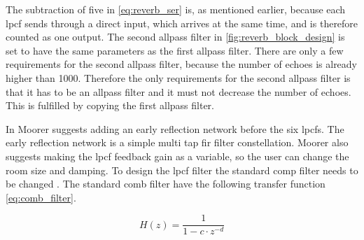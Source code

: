 The subtraction of five in \autoref{eq:reverb_ser} is, as mentioned earlier, because each \gls{lpcf} sends through a direct input, which arrives at the same time, and is therefore counted as one output.
The second allpass filter in \autoref{fig:reverb_block_design} is set to have the same parameters as the first allpass filter. There are only a few requirements for the second allpass filter, because the number of echoes is already higher than 1000. Therefore the only requirements for the second allpass filter is that it has to be an allpass filter and it must not decrease the number of echoes. This is fulfilled by copying the first allpass filter. 
    
%

%


In \citep{DAFX} Moorer suggests adding an early reflection network before the six \gls{lpcf}s. The early reflection network is a simple multi tap \gls{fir} filter constellation. Moorer also suggests making the \gls{lpcf} feedback gain as a variable, so the user can change the room size and damping. To design the \gls{lpcf} filter the standard comp filter needs to be changed  \citep{LPCFfd}. The standard comb filter have the following transfer function \autoref{eq:comb_filter}.

\begin{equation}\label{eq:comb_filter}
H(z)=\frac{1}{1-c \cdot z^{-d}}
\end{equation}

    \startexplain
{}
    \stopexplain

